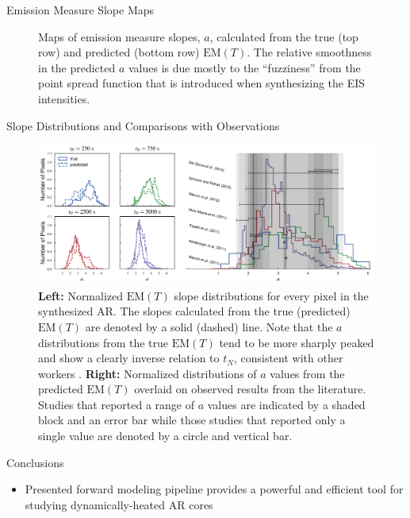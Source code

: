 \documentclass[final]{beamer}
\begin{document}
\begin{frame}
\begin{columns}[T]
\begin{column}{0.49\linewidth}
\begin{block}{Emission Measure Slope Maps}
\begin{figure}
        \caption{Maps of emission measure slopes, $a$, calculated from the true (top row) and predicted (bottom row) $\mathrm{EM}(T)$. The relative smoothness in the predicted $a$ values is due mostly to the ``fuzziness'' from the point spread function that is introduced when synthesizing the EIS intensities.}
        \label{fig:em_slope_maps}
      \end{figure}
      \vspace{-0.5ex}
    \end{block}
    \begin{block}{Slope Distributions and Comparisons with Observations}
      \begin{figure}
        \includegraphics[width=\columnwidth]{figures/slope_distributions.pdf}
        \caption{\textbf{Left:} Normalized $\mathrm{EM}(T)$ slope distributions for every pixel in the synthesized AR. The slopes calculated from the true (predicted) $\mathrm{EM}(T)$ are denoted by a solid (dashed) line. Note that the $a$ distributions from the true $\mathrm{EM}(T)$ tend to be more sharply peaked and show a clearly inverse relation to $t_N$, consistent with other workers \citep[e.g.][]{cargill_active_2014}. \textbf{Right:} Normalized distributions of $a$ values from the predicted $\mathrm{EM}(T)$ overlaid on observed results from the literature. Studies that reported a range of $a$ values are indicated by a shaded block and an error bar while those studies that reported only a single value are denoted by a circle and vertical bar.}
        \label{fig:slope_dist}
      \end{figure}
      \vspace{-0.5ex}
    \end{block}
    \begin{block}{Conclusions}
      \begin{itemize}
        \item Presented forward modeling pipeline provides a powerful and efficient tool for studying dynamically-heated AR cores

\end{itemize}
\end{block}
\end{column}
\end{columns}
\end{frame}
\end{document}
